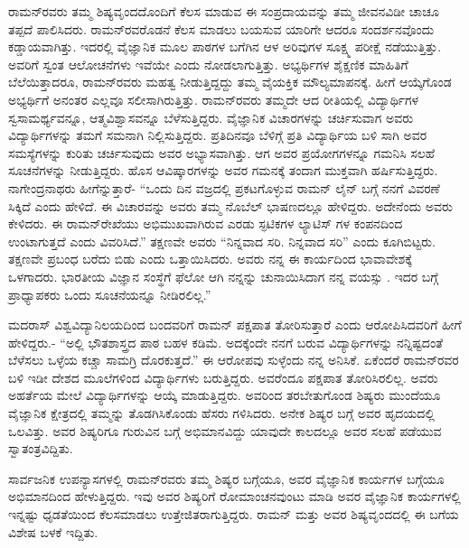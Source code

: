 ರಾಮನ್‍ರವರು ತಮ್ಮ ಶಿಷ್ಯವೃಂದದೊಂದಿಗೆ ಕೆಲಸ ಮಾಡುವ ಈ ಸಂಪ್ರದಾಯವನ್ನು ತಮ್ಮ ಜೀವನವಿಡೀ ಚಾಚೂ ತಪ್ಪದೆ ಪಾಲಿಸಿದರು. ರಾಮನ್‍ರವರೊಡನೆ ಕೆಲಸ ಮಾಡಲು ಬಯಸುವ ಯಾರಿಗೇ ಆದರೂ ಸಂದರ್ಶನವೊಂದು ಕಡ್ಡಾಯವಾಗಿತ್ತು. ಇದರಲ್ಲಿ ವೈಜ್ಞಾನಿಕ ಮೂಲ ಪಾಠಗಳ ಬಗೆಗಿನ ಆಳ ಅರಿವುಗಳ ಸೂಕ್ಷ್ಮ ಪರೀಕ್ಷೆ ನಡೆಯುತ್ತಿತ್ತು. ಅವರಿಗೆ ಸ್ವಂತ ಆಲೋಚನೆಗಳು ಇವೆಯೇ ಎಂದು ನೋಡಲಾಗುತ್ತಿತ್ತು. ಅಭ್ಯರ್ಥಿಗಳ ಶೈಕ್ಷಣಿಕ ಮಾಹಿತಿಗೆ ಬೆಲೆಯಿತ್ತಾದರೂ, ರಾಮನ್‍ರವರು ಮಹತ್ವ ನೀಡುತ್ತಿದ್ದದ್ದು ತಮ್ಮ ವೈಯಕ್ತಿಕ ಮೌಲ್ಯಮಾಪನಕ್ಕೆ. ಹೀಗೆ ಆಯ್ಕೆಗೊಂಡ ಅಭ್ಯರ್ಥಿಗೆ ಅನಂತರ ಎಲ್ಲವೂ ಸಲೀಸಾಗಿರುತ್ತಿತ್ತು. ರಾಮನ್‍ರವರು ತಮ್ಮದೇ ಆದ ರೀತಿಯಲ್ಲಿ ವಿದ್ಯಾರ್ಥಿಗಳ ಸ್ವಸಾಮರ್ಥ್ಯವನ್ನೂ, ಆತ್ಮವಿಶ್ವಾಸವನ್ನೂ ಬೆಳೆಸುತ್ತಿದ್ದರು. ವೈಜ್ಞಾನಿಕ ವಿಚಾರಗಳನ್ನು ಚರ್ಚಿಸುವಾಗ ಅವರು ವಿದ್ಯಾರ್ಥಿಗಳನ್ನು ತಮಗೆ ಸಮನಾಗಿ ನಿಲ್ಲಿಸುತ್ತಿದ್ದರು. ಪ್ರತಿದಿನವೂ ಬೆಳಿಗ್ಗೆ ಪ್ರತಿ ವಿದ್ಯಾರ್ಥಿಯ ಬಳಿ ಸಾಗಿ ಅವರ ಸಮಸ್ಯೆಗಳನ್ನು ಕುರಿತು ಚರ್ಚಿಸುವುದು ಅವರ ಅಭ್ಯಾಸವಾಗಿತ್ತು. ಆಗ ಅವರ ಪ್ರಯೋಗಗಳನ್ನೂ ಗಮನಿಸಿ ಸಲಹೆ ಸೂಚನೆಗಳನ್ನು ನೀಡುತ್ತಿದ್ದರು. ಹೊಸ ಆವಿಷ್ಕಾರಗಳನ್ನು ಅವರ ಗಮನಕ್ಕೆ ತಂದಾಗ ಮುಕ್ತವಾಗಿ ಹರ್ಷಿಸುತ್ತಿದ್ದರು. ನಾಗೇಂದ್ರನಾಥರು ಹೀಗೆನ್ನುತ್ತಾರೆ- “ಒಂದು ದಿನ ವಜ್ರದಲ್ಲಿ ಪ್ರಕಟಗೊಳ್ಳುವ ರಾಮನ್ ಲೈನ್ ಬಗ್ಗೆ ನನಗೆ ವಿವರಣೆ ಸಿಕ್ಕಿದೆ ಎಂದು ಹೇಳಿದೆ. ಈ ವಿಚಾರವನ್ನು ಅವರು ತಮ್ಮ ನೊಬೆಲ್ ಭಾಷಣದಲ್ಲೂ ಹೇಳಿದ್ದರು. ಅದೇನೆಂದು ಅವರು ಕೇಳಿದರು. ಈ ರಾಮನ್‌ರೇಖೆಯು ಅಭಿಮುಖವಾಗಿರುವ ಎರಡು ಸ್ಫಟಿಕಗಳ ಲ್ಯಾಟಿಸ್ ಗಳ ಕಂಪನದಿಂದ ಉಂಟಾಗುತ್ತದೆ ಎಂದು ವಿವರಿಸಿದೆ.” ತಕ್ಷಣವೇ ಅವರು “ನಿನ್ನವಾದ ಸರಿ. ನಿನ್ನವಾದ ಸರಿ” ಎಂದು ಕೂಗಿಬಿಟ್ಟರು. ತಕ್ಷಣವೇ ಪ್ರಬಂಧ ಬರೆದು ಬಿಡು ಎಂದು ಒತ್ತಾಯಿಸಿದರು. ಅವರು ನನ್ನ ಈ ಕಾರ್ಯದಿಂದ ಭಾವಾವೇಶಕ್ಕೆ ಒಳಗಾದರು. ಭಾರತೀಯ ವಿಜ್ಞಾನ ಸಂಸ್ಥೆಗೆ ಫೆಲೋ ಆಗಿ ನನ್ನನ್ನು ಚುನಾಯಿಸಿದಾಗ ನನ್ನ ವಯಸ್ಸು . ಇದರ ಬಗ್ಗೆ ಪ್ರಾಧ್ಯಾಪಕರು ಒಂದು ಸೂಚನೆಯನ್ನೂ ನೀಡಿರಲಿಲ್ಲ.”

ಮದರಾಸ್ ವಿಶ್ವವಿದ್ಯಾನಿಲಯದಿಂದ ಬಂದವರಿಗೆ ರಾಮನ್ ಪಕ್ಷಪಾತ ತೋರಿಸುತ್ತಾರೆ ಎಂದು ಆರೋಪಿಸಿದವರಿಗೆ ಹೀಗೆ ಹೇಳಿದ್ದರು.- “ಅಲ್ಲಿ ಭೌತಶಾಸ್ತ್ರದ ಪಾಠ ಬಹಳ ಕಡಿಮೆ. ಅದಕ್ಕೆಂದೇ ನನಗೆ ಬರುವ ವಿದ್ಯಾರ್ಥಿಗಳನ್ನು ನನ್ನಿಷ್ಟದಂತೆ ಬೆಳೆಸಲು ಒಳ್ಳೆಯ ಕಚ್ಚಾ ಸಾಮಗ್ರಿ ದೊರಕುತ್ತದೆ.” ಈ ಆರೋಪವು ಸುಳ್ಳೆಂದು ನನ್ನ ಅನಿಸಿಕೆ. ಏಕೆಂದರೆ ರಾಮನ್‍ರವರ ಬಳಿ ಇಡೀ ದೇಶದ ಮೂಲೆಗಳಿಂದ ವಿದ್ಯಾರ್ಥಿಗಳು ಬರುತ್ತಿದ್ದರು. ಅವರೆಂದೂ ಪಕ್ಷಪಾತ ತೋರಿಸಿರಲಿಲ್ಲ. ಅವರು ಅಹರ್ತೆಯ ಮೇಲೆ ವಿದ್ಯಾರ್ಥಿಗಳನ್ನು ಆಯ್ಕೆ ಮಾಡುತ್ತಿದ್ದರು. ಅವರಿಂದ ತರಬೇತುಗೊಂಡ ಶಿಷ್ಯರು ಮುಂದೆಯೂ ವೈಜ್ಞಾನಿಕ ಕ್ಷೇತ್ರದಲ್ಲಿ ತಮ್ಮನ್ನು ತೊಡಗಿಸಿಕೊಂಡು ಹೆಸರು ಗಳಿಸಿದರು. ಅನೇಕ ಶಿಷ್ಯರ ಬಗ್ಗೆ ಅವರ ಹೃದಯದಲ್ಲಿ ಒಲವಿತ್ತು. ಅವರ ಶಿಷ್ಯರಿಗೂ ಗುರುವಿನ ಬಗ್ಗೆ ಅಭಿಮಾನವಿದ್ದು ಯಾವುದೇ ಕಾಲದಲ್ಲೂ ಅವರ ಸಲಹೆ ಪಡೆಯುವ ಸ್ವಾತಂತ್ರವಿದ್ದಿತು.

ಸಾರ್ವಜನಿಕ ಉಪನ್ಯಾಸಗಳಲ್ಲಿ ರಾಮನ್‍ರವರು ತಮ್ಮ ಶಿಷ್ಯರ ಬಗ್ಗೆಯೂ, ಅವರ ವೈಜ್ಞಾನಿಕ ಕಾರ್ಯಗಳ ಬಗ್ಗೆಯೂ ಅಭಿಮಾನದಿಂದ ಹೇಳುತ್ತಿದ್ದರು. ಇವು ಅವರ ಶಿಷ್ಯರಿಗೆ ರೋಮಾಂಚನವುಂಟು ಮಾಡಿ ಅವರ ವೈಜ್ಞಾನಿಕ ಕಾರ್ಯಗಳಲ್ಲಿ ಇನ್ನಷ್ಟು ಧೃಡತೆಯಿಂದ ಕೆಲಸಮಾಡಲು ಉತ್ತೇಜಿತರಾಗುತ್ತಿದ್ದರು. ರಾಮನ್ ಮತ್ತು ಅವರ ಶಿಷ್ಯವೃಂದದಲ್ಲಿ ಈ ಬಗೆಯ ವಿಶೇಷ ಬಳಕೆ ಇದ್ದಿತು.



